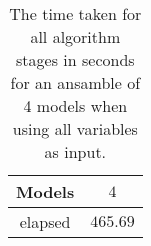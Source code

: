 \begin{table}[!ht]
	\centering
	\begin{tabular}{|c|c|}
		\hline
		Models & $4$ \\ \hline
		elapsed & $465.69$ \\ \hline
	\end{tabular}
	\caption{The time taken for all algorithm stages in seconds for an ansamble of 4 models when using all variables as input.}
	\label{tab:time:ansamble:reverse:all:4}
\end{table}
